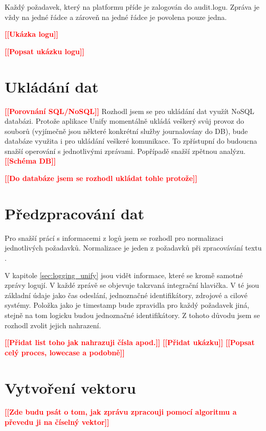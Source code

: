 \documentclass[thesis=M,czech]{FITthesis}[2012/10/20]
\newcommand{\todo}[1]{\textcolor{red}{\textbf{[[#1]]}}}
\newcommand{\blind}[1][1]{\textcolor{gray}{\Blindtext[#1][1]}}
\begin{document}
		Každý požadavek, který na platformu příde je zalogován do audit.logu. Zpráva je vždy na jedné řádce a zároveň na jedné řádce je povolena pouze jedna.
		
		\todo{Ukázka logu}
		
		\todo{Popsat ukázku logu}
		
		
	\section{Ukládání dat}
		\todo{Porovnání SQL/NoSQL}
		Rozhodl jsem se pro ukládání dat využít NoSQL databázi. Protože aplikace Unify momentálně ukládá veškerý svůj provoz do souborů (vyjímečně jsou některé konkrétní služby journalovány do DB), bude databáze využita i pro ukládání veškeré komunikace. To zpřístupní do budoucna snažší operování s jednotlivými zprávami. Popřípadě snažší zpětnou analýzu.
		\todo{Schéma DB}
		
		\todo{Do databáze jsem se rozhodl ukládat tohle protože}
					
	\section{Předzpracování dat}
		\label{sec:preprocessing}
		Pro snažší prácí s informacemi z logů jsem se rozhodl pro normalizaci jednotlivých požadavků. Normalizace je jeden z požadavků při zpracovávání textu \cite{txtNrmlztn}.
		
		V kapitole \ref{sec:logging_unify} jsou vidět informace, které se kromě samotné zprávy logují. V každé zprávě se objevuje takzvaná integrační hlavička. V té jsou základní údaje jako čas odeslání, jednoznačné identifikátory, zdrojové a cilové systémy. Položka jako je timestamp bude zpravidla pro každý požadavek jiná, stejně na tom logicku budou jednoznačné identifikátory. Z tohoto důvodu jsem se rozhodl zvolit jejich nahrazení.
		
		\todo{Přidat list toho jak nahrazuji čísla apod.}
		\todo{Přidat ukázku}
		\todo{Popsat celý proces, lowecase a podobně}
			
	\section{Vytvoření vektoru}
		\label{sec:construct_vector}
		\todo{Zde budu psát o tom, jak zprávu zpracouji pomocí algoritmu a převedu ji na číselný vektor}
		\blind[2]
		
		
\end{document}
